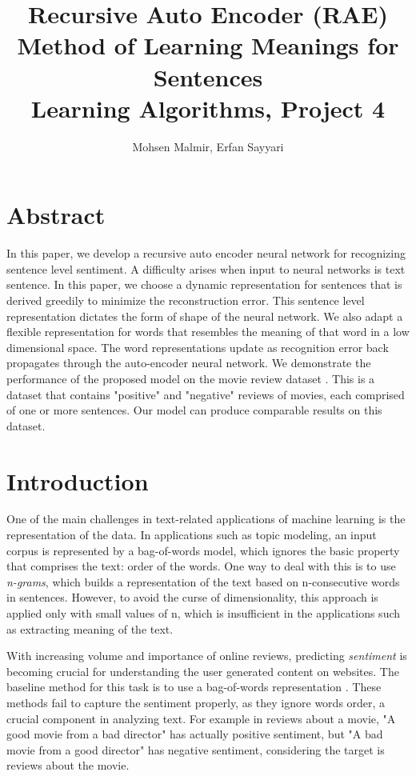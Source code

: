 \documentclass[twoside,12pt]{article}
\begin{document}
\title{Recursive Auto Encoder (RAE)
Method of Learning Meanings for Sentences\\  Learning Algorithms, Project 4}
\author{Mohsen Malmir, Erfan Sayyari}
\maketitle

\section*{Abstract}
In this paper, we develop a recursive auto encoder neural network for recognizing sentence level sentiment. A difficulty arises when input to neural networks is text sentence. In this paper, we choose a dynamic representation for sentences that is derived greedily to minimize the reconstruction error. This sentence level representation dictates the form of shape of the neural network. We also adapt a flexible representation for words that resembles the meaning of that word in a low dimensional space. The word representations  update as recognition error back propagates through the auto-encoder neural network. We demonstrate the performance of the proposed model on the movie review dataset \cite{pang2005}. This is a dataset that contains "positive" and "negative" reviews of movies, each comprised of one or more sentences. Our model can produce comparable results on this dataset.

\section{Introduction}
One of the main challenges in text-related applications of machine learning is the representation of the data. In applications such as topic modeling, an input corpus is represented by a bag-of-words model, which ignores the basic property that comprises the text: order of the words. One way to deal with this is to use \emph{n-grams}, which builds a representation of the text based on n-consecutive words in sentences. However, to avoid the curse of dimensionality, this approach is applied only with small values of n, which is insufficient in the applications such as extracting meaning of the text.

With increasing volume and importance of online reviews, predicting \emph{sentiment} is becoming crucial for understanding the user generated content on websites. The baseline method for this task is to use a bag-of-words representation \cite{pang2002}. These methods fail to capture the sentiment properly, as they ignore words order, a crucial component in analyzing text. For example in reviews about a movie, "A good movie from a bad director" has actually positive sentiment, but "A bad movie from a good director" has negative sentiment, considering the target is reviews about the movie.
\end{document}
